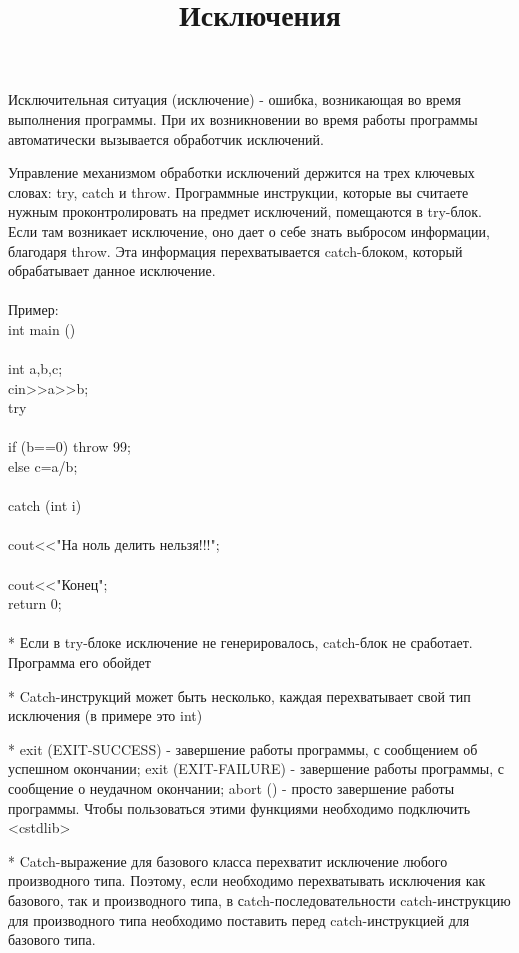 \documentclass[a4paper,10pt]{article}
\title{Исключения}
\begin{document}
\maketitle

Исключительная ситуация (исключение) - ошибка, возникающая во время выполнения программы. При их возникновении во время работы программы автоматически вызывается обработчик исключений.

Управление механизмом обработки исключений держится на трех ключевых словах: try, catch и throw. Программные инструкции, которые вы считаете нужным проконтролировать на предмет исключений, помещаются в try-блок. Если там возникает исключение, оно дает о себе знать выбросом информации, благодаря throw. Эта информация перехватывается catch-блоком, который обрабатывает данное исключение.
\\
\\Пример: 
\\
\hline
int main ()
\\{
\\	int a,b,c;
\\	cin>>a>>b;
\\	try
\\	{
\\		if (b==0) throw 99;
\\		else c=a/b;
\\	}
\\	catch (int i)
\\	{
\\		cout<<"На ноль делить нельзя!!!";
\\}
\\	cout<<"Конец";
\\	return 0;
\\}
\hline
\\

* Если в try-блоке исключение не генерировалось, catch-блок не сработает. Программа его обойдет

* Catch-инструкций может быть несколько, каждая перехватывает свой тип исключения (в примере это int)

* exit (EXIT-SUCCESS) - завершение работы программы, с сообщением об успешном окончании; exit (EXIT-FAILURE) - завершение работы программы, с сообщение о неудачном окончании; abort () - просто завершение работы программы. Чтобы пользоваться этими функциями необходимо подключить <cstdlib>

* Catch-выражение для базового класса перехватит исключение любого производного типа. Поэтому, если необходимо перехватывать исключения как базового, так и производного типа, в сatch-последовательности catch-инструкцию для производного типа необходимо поставить перед catch-инструкцией для базового типа.
\end{document}
